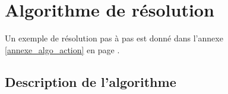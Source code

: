 \chapter{Algorithme de résolution}
Un exemple de résolution pas à pas est donné dans l'annexe \ref{annexe_algo_action} en page \pageref{annexe_algo_action}.
\section{Description de l'algorithme}

